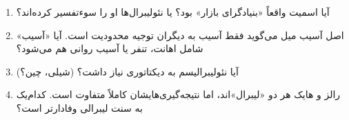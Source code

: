 \vspace{20pt}

\begin{questionbox}

\begin{enumerate}[nosep, rightmargin=1cm]
    \item آیا اسمیت واقعاً «بنیادگرای بازار» بود؟ یا نئولیبرال‌ها او را سوءتفسیر کرده‌اند؟

    \item اصل آسیب میل می‌گوید فقط آسیب به دیگران توجیه محدودیت است. آیا «آسیب» شامل اهانت، تنفر یا آسیب روانی هم می‌شود؟

    \item آیا نئولیبرالیسم به دیکتاتوری نیاز داشت؟ (شیلی، چین؟)

    \item رالز و هایک هر دو «لیبرال»اند، اما نتیجه‌گیری‌هایشان کاملاً متفاوت است. کدام‌یک به سنت لیبرالی وفادارتر است؟
\end{enumerate}

\end{questionbox}

